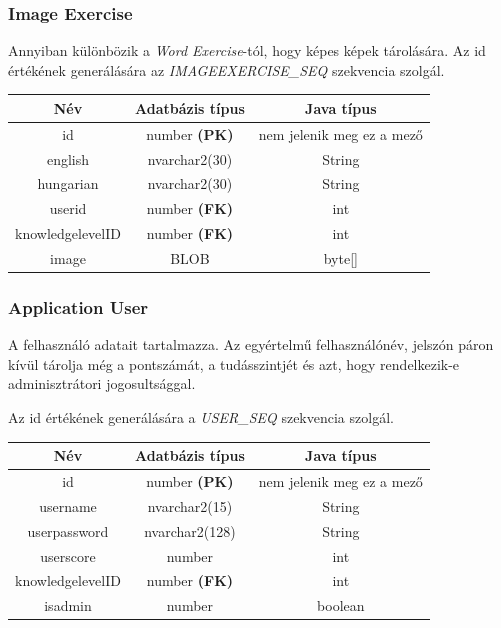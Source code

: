 \documentclass[11pt, a4paper]{article}
\begin{document}
    \subsubsection{Image Exercise}
    Annyiban különbözik a \textit{Word Exercise}-tól, hogy képes képek tárolására. Az id értékének generálására az \textit{IMAGEEXERCISE\_SEQ} szekvencia szolgál.
    
    \begin{table}[!h]
    	\centering
    	\begin{tabular} {|c|c|c|}
    		\hline
    		Név & Adatbázis típus & Java típus \\
    		\hline
    		id & number \textbf{(PK)} & nem jelenik meg ez a mező \\
    		english & nvarchar2(30) & String \\
    		hungarian & nvarchar2(30) & String \\
    		userid & number \textbf{(FK)} & int \\
    		knowledgelevelID & number \textbf{(FK)} & int \\
    		image & BLOB & byte[] \\
    		\hline
    	\end{tabular}
    \end{table}
    
    \subsubsection{Application User}
    A felhasználó adatait tartalmazza. Az egyértelmű felhasználónév, jelszón páron kívül tárolja még a pontszámát, a tudásszintjét és azt, hogy rendelkezik-e adminisztrátori jogosultsággal.
    
    Az id értékének generálására a \textit{USER\_SEQ} szekvencia szolgál.
    
    \begin{table}[!h]
    	\centering
    	\begin{tabular} {|c|c|c|}
    		\hline
    		Név & Adatbázis típus & Java típus \\
    		\hline
    		id & number \textbf{(PK)} & nem jelenik meg ez a mező \\
    		username & nvarchar2(15) & String \\
    		userpassword & nvarchar2(128) & String \\
    		userscore & number & int \\
    		knowledgelevelID & number \textbf{(FK)} & int \\
    		isadmin & number & boolean \\
    		\hline
    	\end{tabular}
    \end{table}
    
\end{document}
